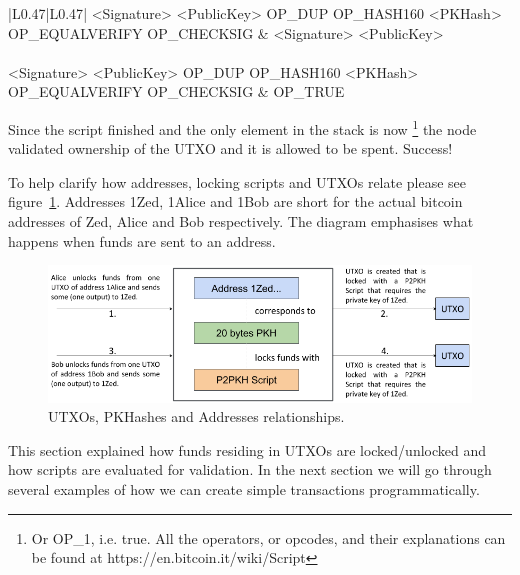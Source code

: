 \begin{center}
\begin{longtable}[H]{ |L{0.47\linewidth}|L{0.47\linewidth}| }
\hline
\textsf{<Signature> <PublicKey> OP\_DUP OP\_HASH160 <PKHash> {\color{blue}OP\_EQUALVERIFY} OP\_CHECKSIG} & \textsf{<Signature> <PublicKey>} \\
\hline
\hline
{}\\
\hline
\textsf{<Signature> <PublicKey> OP\_DUP OP\_HASH160 <PKHash> OP\_EQUALVERIFY {\color{blue}OP\_CHECKSIG}} & \textsf{OP\_TRUE} \\
\hline
\end{longtable}
\end{center}

Since the script finished and the only element in the stack is now \footnote{Or OP\_1, i.e. true. All the operators, or opcodes, and their explanations can be found at https://en.bitcoin.it/wiki/Script} the node validated ownership of the UTXO and it is allowed to be spent. Success!

To help clarify how addresses, locking scripts and UTXOs relate please see figure~\ref{fig:utxos-pkhashes-addresses}. Addresses 1Zed, 1Alice and 1Bob are short for the actual bitcoin addresses of Zed, Alice and Bob respectively. The diagram emphasises what happens when funds are sent to an address.
\vspace{1em}

\begin{figure}[H]
\begin{center}
\includegraphics[scale=0.5]{images/utxos-pkhashes-addresses}
\caption{UTXOs, PKHashes and Addresses relationships.}
\label{fig:utxos-pkhashes-addresses}
\end{center}
\end{figure}

This section explained how funds residing in UTXOs are locked/unlocked and how scripts are evaluated for validation. In the next section we will go through several examples of how we can create simple transactions programmatically.



